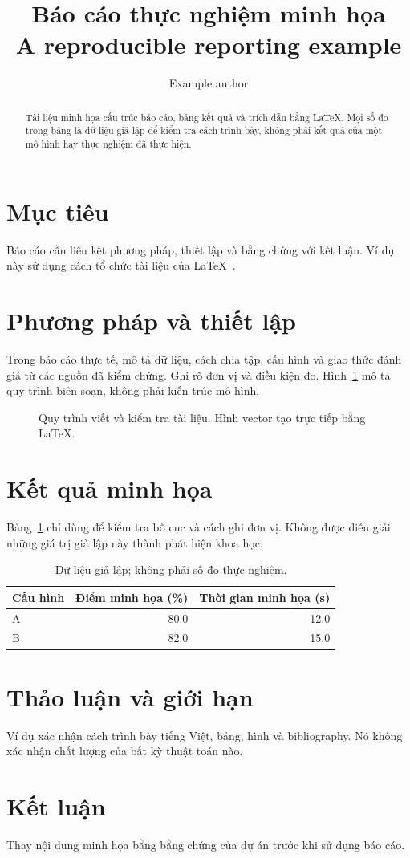\documentclass[10pt,a4paper]{article}
\title{Báo cáo thực nghiệm minh họa\\\large A reproducible reporting example}
\author{Example author}
\date{}
\begin{document}
\maketitle
\begin{abstract}
Tài liệu minh họa cấu trúc báo cáo, bảng kết quả và trích dẫn bằng LaTeX.
Mọi số đo trong bảng là dữ liệu giả lập để kiểm tra cách trình bày,
không phải kết quả của một mô hình hay thực nghiệm đã thực hiện.
\end{abstract}
\section{Mục tiêu}
Báo cáo cần liên kết phương pháp, thiết lập và bằng chứng với kết luận.
Ví dụ này sử dụng cách tổ chức tài liệu của LaTeX~\cite{lamport1994}.
\section{Phương pháp và thiết lập}
Trong báo cáo thực tế, mô tả dữ liệu, cách chia tập, cấu hình và giao thức
đánh giá từ các nguồn đã kiểm chứng. Ghi rõ đơn vị và điều kiện đo.
Hình~\ref{fig:workflow} mô tả quy trình biên soạn, không phải kiến trúc mô hình.
\begin{figure}[ht]
\centering
{}
\caption{Quy trình viết và kiểm tra tài liệu. Hình vector tạo trực tiếp bằng LaTeX.}
\label{fig:workflow}
\end{figure}
\section{Kết quả minh họa}
Bảng~\ref{tab:results} chỉ dùng để kiểm tra bố cục và cách ghi đơn vị.
Không được diễn giải những giá trị giả lập này thành phát hiện khoa học.
\begin{table}[ht]
\centering
\caption{Dữ liệu giả lập; không phải số đo thực nghiệm.}
\label{tab:results}
\begin{tabular}{lrr}
\toprule
Cấu hình & Điểm minh họa (\%) & Thời gian minh họa (s) \\
\midrule
A & 80.0 & 12.0 \\
B & 82.0 & 15.0 \\
\bottomrule
\end{tabular}
\end{table}
\section{Thảo luận và giới hạn}
Ví dụ xác nhận cách trình bày tiếng Việt, bảng, hình và bibliography.
Nó không xác nhận chất lượng của bất kỳ thuật toán nào.
\section{Kết luận}
Thay nội dung minh họa bằng bằng chứng của dự án trước khi sử dụng báo cáo.


\end{document}
